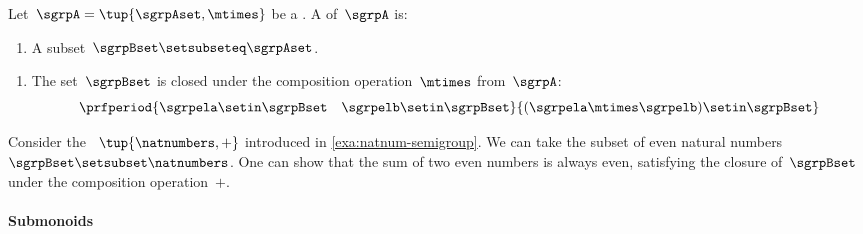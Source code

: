 \begin{definition}[Subsemigroup]\label{def:subsemigroup}
    Let~$\sgrpA = \tup{\sgrpAset, \mtimes}$ be a .
    A  of~$\sgrpA$ is:

    \constit

    \begin{enumerate}
        \item A subset~$\sgrpBset \setsubseteq \sgrpAset$.
    \end{enumerate}

    \condit

    \begin{enumerate}
        \item The set~$\sgrpBset$ is closed under the composition operation~$\mtimes$ from~$\sgrpA$:
              \begin{equation}\label{eq:subsemigroup-closure}
                  \prfperiod{
                      \sgrpela \setin \sgrpBset \quad \sgrpelb \setin \sgrpBset
                  }{
                      (\sgrpela \mtimes \sgrpelb) \setin \sgrpBset
                  }
              \end{equation}
    \end{enumerate}
\end{definition}

\begin{example}
    \label{exa:evennum-subsemigroup}
    Consider the ~$\tup{\natnumbers,+}$ introduced in \cref{exa:natnum-semigroup}.
    We can take the subset of even natural numbers~$\sgrpBset \setsubset \natnumbers$.
    One can show that the sum of two even numbers is always even, satisfying the closure of~$\sgrpBset$ under the composition operation~$+$.
\end{example}



\paragraph{Submonoids}


